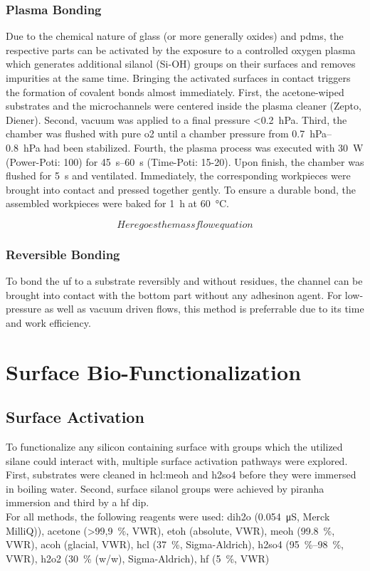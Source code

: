 \subsubsection{Plasma Bonding}
Due to the chemical nature of glass (or more generally oxides) and \gls{pdms}, the respective parts can be activated by the exposure to a controlled oxygen plasma which generates additional silanol (Si-OH) groups on their surfaces and removes impurities at the same time. Bringing the activated surfaces in contact triggers the formation of covalent bonds almost immediately. First, the acetone-wiped substrates and the microchannels were centered inside the plasma cleaner (Zepto, Diener). Second, vacuum was applied to a final pressure <\SI{0.2}{\hecto\pascal}. Third, the chamber was flushed with pure \gls{o2} until a chamber pressure from \SIrange{0.7}{0.8}{\hecto\pascal} had been stabilized. Fourth, the plasma process was executed with \SI{30}{\watt} (Power-Poti: 100) for \SIrange{45}{60}{\second} (Time-Poti: 15-20). Upon finish, the chamber was flushed for \SI{5}{\second} and ventilated. Immediately, the corresponding workpieces were brought into contact and pressed together gently. To ensure a durable bond, the assembled workpieces were baked for \SI{1}{\hour} at \SI{60}{\degreeCelsius}.

\begin{equation}
	Here goes the mass flow equation
\end{equation}

\subsubsection{Reversible Bonding}
To bond the \gls{uf} to a substrate reversibly and without residues, the channel can be brought into contact with the bottom part without any adhesinon agent. For low-pressure as well as vacuum driven flows, this method is preferrable due to its time and work efficiency.

\section{Surface Bio-Functionalization}

\subsection{Surface Activation}
To functionalize any silicon containing surface with  groups which the utilized silane could interact with, multiple surface activation pathways were explored. First, substrates were cleaned in \gls{hcl}:\gls{meoh} and \gls{h2so4} before they were immersed in boiling water. Second, surface silanol groups were achieved by \gls{piranha} immersion and third by a \gls{hf} dip.\\
For all methods, the following reagents were used: \gls{dih2o} (\SI{0,054}{\micro\siemens}, Merck MilliQ)), acetone (\SI{>99,9}{\percent}, VWR), \gls{etoh} (absolute, VWR), \gls{meoh} (\SI{99.8}{\percent}, VWR), \gls{acoh} (glacial, VWR), \gls{hcl} (\SI{37}{\percent}, Sigma-Aldrich), \gls{h2so4} (\SIrange{95}{98}{\percent}, VWR), \gls{h2o2} (\SI{30}{\percent} (w/w), Sigma-Aldrich), \gls{hf} (\SI{5}{\percent}, VWR)

